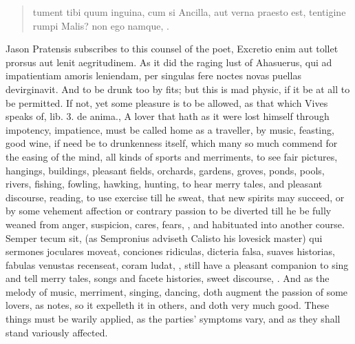 \begin{latin}
\begin{verse}
tument tibi quum inguina, cum si
Ancilla, aut verna praesto est, tentigine rumpi
Malis? non ego namque, \etc{}.
\end{verse}
\end{latin}

Jason Pratensis subscribes to this counsel of the poet, Excretio
enim aut tollet prorsus aut lenit aegritudinem. As it did the raging
lust of Ahasuerus, qui ad impatientiam amoris leniendam, per
singulas fere noctes novas puellas devirginavit. And to be drunk too by
fits; but this is mad physic, if it be at all to be permitted. If not,
yet some pleasure is to be allowed, as that which Vives speaks of, lib.
3. de anima., A lover that hath as it were lost himself through
impotency, impatience, must be called home as a traveller, by music,
feasting, good wine, if need be to drunkenness itself, which many so
much commend for the easing of the mind, all kinds of sports and
merriments, to see fair pictures, hangings, buildings, pleasant fields,
orchards, gardens, groves, ponds, pools, rivers, fishing, fowling,
hawking, hunting, to hear merry tales, and pleasant discourse, reading,
to use exercise till he sweat, that new spirits may succeed, or by some
vehement affection or contrary passion to be diverted till he be fully
weaned from anger, suspicion, cares, fears, \etc{}, and habituated into
another course. Semper tecum sit, (as Sempronius adviseth Calisto
his lovesick master) qui sermones joculares moveat, conciones
ridiculas, dicteria falsa, suaves historias, fabulas venustas
recenseat, coram ludat, \etc{}, still have a pleasant companion to sing
and tell merry tales, songs and facete histories, sweet discourse, \etc{}.
And as the melody of music, merriment, singing, dancing, doth augment
the passion of some lovers, as  \Avicenna{} notes, so it expelleth
it in others, and doth very much good. These things must be warily
applied, as the parties' symptoms vary, and as they shall stand
variously affected.

